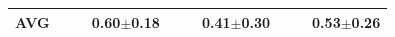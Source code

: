 \documentclass[encoding=utf8,british]{tumphthesis}
\begin{document}
\begin{table}[H]
\begin{subtable}{1\textwidth}
{\begin{tabular}{|l|llr|llr|llr|}
\textbf{AVG}                             &                                                      &                                                       & \textbf{0.60$\pm$0.18}                           &                                                      &                                                       & \textbf{0.41$\pm$0.30}                           &                                                      &                                                       & \textbf{0.53$\pm$0.26}                          
 \\ \hline
\end{tabular}}
\end{subtable}

\bigskip
\begin{subtable}{1\textwidth}
\label{tab:benchmark-radmon-alhCSOO}


\end{subtable}
\end{table}
\end{document}
